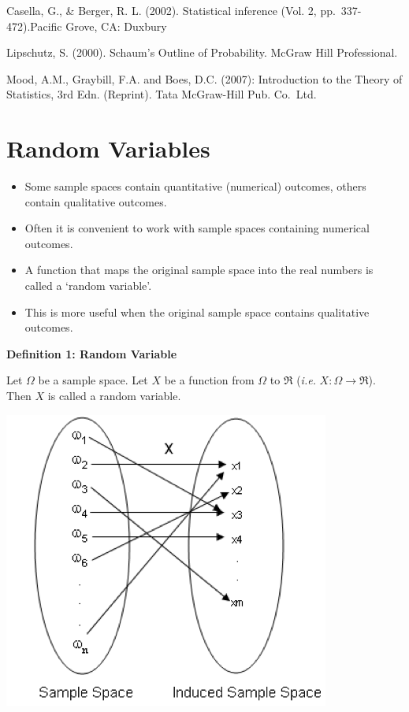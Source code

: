 \documentclass[]{book}
\providecommand{\tightlist}{%
  \setlength{\itemsep}{0pt}\setlength{\parskip}{0pt}}
\begin{document}
Casella, G., \& Berger, R. L. (2002). Statistical inference (Vol. 2, pp.~337-472).Pacific Grove, CA: Duxbury

Lipschutz, S. (2000). Schaum's Outline of Probability. McGraw Hill Professional.

Mood, A.M., Graybill, F.A. and Boes, D.C. (2007): Introduction to the Theory of Statistics, 3rd Edn. (Reprint). Tata McGraw-Hill Pub. Co.~Ltd.

\hypertarget{random-variables}{%
\chapter{Random Variables}\label{random-variables}}

\begin{itemize}
\tightlist
\item
  Some sample spaces contain quantitative (numerical) outcomes, others contain qualitative outcomes.
\item
  Often it is convenient to work with sample spaces containing numerical outcomes.
\item
  A function that maps the original sample space into the real numbers is called a `random variable'.
\item
  This is more useful when the original sample space contains qualitative outcomes.
\end{itemize}

\textbf{Definition 1: Random Variable}

Let \(\Omega\) be a sample space. Let \(X\) be a function from \(\Omega\) to \(\Re\) (\emph{i.e.} \(X:\Omega \rightarrow \Re\)). Then \(X\) is called a random variable.

\begin{center}\includegraphics[width=0.5\linewidth]{figure/Ch9_F1} \end{center}
\end{document}
